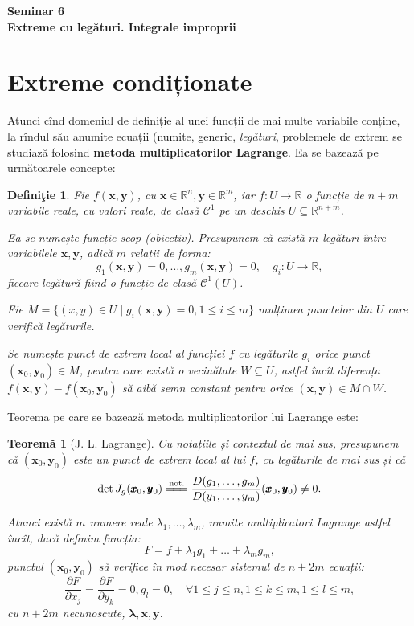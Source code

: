 \documentclass[11pt,a4paper]{article}
\newcommand\kal{\mathcal}
\newcommand\seq{\subseteq}
\newcommand\RR{\mathbb{R}}
\theoremstyle{dotless}
\newtheorem{theorem}{Teorem\u{a}}[section]
\theoremstyle{dotlessdr}
\newtheorem{definition}{Defini\c{t}ie}[section]
\begin{document}
\begin{center}
  {\large\textbf{
      Seminar 6 \\
      Extreme cu legături. Integrale improprii
    }}
\end{center}

\vspace{1cm}

\section{Extreme condiționate}
\label{sec:extreme-cond}

Atunci cînd domeniul de definiție al unei funcții de mai multe variabile conține,
la rîndul său anumite ecuații (numite, generic, \emph{legături}, problemele de
extrem se studiază folosind \textbf{metoda multiplicatorilor Lagrange}. Ea se
bazează pe următoarele concepte:

\begin{definition}\label{def:fc-scop}
  Fie $f(\pmb{x}, \pmb{y})$, cu $\pmb{x} \in \RR^n, \pmb{y} \in \RR^m$,
  iar $f : U \to \RR$ o funcție de $n + m$ variabile reale, cu valori reale, de
  clasă $\kal{C}^1$ pe un deschis $U \seq \RR^{n+m}$.

  Ea se numește \emph{funcție-scop (obiectiv)}. Presupunem că există $m$
  legături între variabilele $\pmb{x}, \pmb{y}$, adică $m$ relații de forma:
  \[
    g_1(\pmb{x}, \pmb{y}) = 0, \dots, g_m(\pmb{x}, \pmb{y}) = 0, \quad %
    g_i : U \to \RR,
  \]
  fiecare legătură fiind o funcție de clasă $\kal{C}^1(U)$.

  Fie $M = \{(x, y) \in U \mid g_i(\pmb{x}, \pmb{y}) = 0, 1 \leq i \leq m\}$
  mulțimea punctelor din $U$ care verifică legăturile.

  Se numește \emph{punct de extrem local al funcției $f$ cu legăturile $g_i$}
  orice punct $(\pmb{x}_0, \pmb{y}_0) \in M$, pentru care există o vecinătate
  $W \seq U$, astfel încît diferența $f(\pmb{x}, \pmb{y}) - f(\pmb{x}_0, \pmb{y}_0)$
  să aibă semn constant pentru orice $(\pmb{x}, \pmb{y}) \in M \cap W$.
\end{definition}

Teorema pe care se bazează metoda multiplicatorilor lui Lagrange este:

\begin{theorem}[J. L. Lagrange]\label{thm:lagr-mult}
  Cu notațiile și contextul de mai sus, presupunem că $(\pmb{x}_0, \pmb{y}_0)$
  este un punct de extrem local al lui $f$, cu legăturile de mai sus și că
  \[
    \det J_g(\pmb{x}_0, \pmb{y}_0) \stackrel{\text{not.}}{=\joinrel=\joinrel=} %
    \frac{D(g_1, \dots, g_m)}{D(y_1, \dots, y_m)} (\pmb{x}_0, \pmb{y}_0) \neq 0.
  \]

  Atunci există $m$ numere reale $\lambda_1, \dots, \lambda_m$, numite
  \emph{multiplicatori Lagrange} astfel încît, dacă definim funcția:
  \[
    F = f + \lambda_1 g_1 + \dots + \lambda_m g_m,
  \]
  punctul $(\pmb{x}_0, \pmb{y}_0)$ să verifice în mod necesar sistemul de
  $n + 2m$ ecuații:
  \[
    \frac{\partial F}{\partial x_j} = \frac{\partial F}{\partial y_k} = 0, %
    g_l = 0, \quad \forall 1 \leq j \leq n, 1 \leq k \leq m, 1 \leq l \leq m,
  \]
  cu $n + 2m$ necunoscute, $\pmb{\lambda}, \pmb{x}, \pmb{y}$.
\end{theorem}
\end{document}
